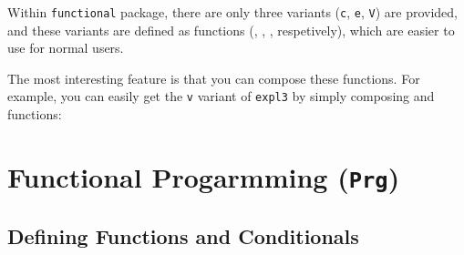 \documentclass[oneside]{book}
\begin{document}
Within \verb!functional! package, there are only three variants
(\verb!c!, \verb!e!, \verb!V!) are provided, and these variants are defined
as functions (, , , respetively),
which are easier to use for normal users.

\begin{demohigh}
\newcommand\test{uvw}
\end{demohigh}

\begin{demohigh}
\newcommand\test{uvw}
\Expand{111\test222}
\end{demohigh}

\begin{demohigh}
\IntSet{}
\Value\lTmpaInt
\end{demohigh}

The most interesting feature is that you can compose these functions.
For example, you can easily get the \verb!v! variant of \verb!expl3! by
simply composing  and  functions:

\begin{demohigh}
\IntSet{}
\end{demohigh}

\chapter{Functional Progarmming (\texttt{Prg})}

\section{Deﬁning Functions and Conditionals}
\end{document}
